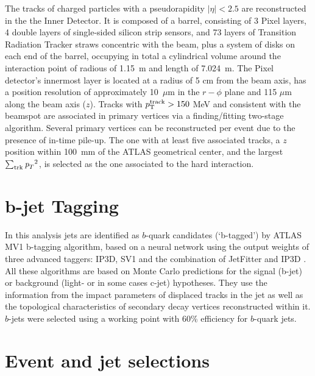 The tracks of charged particles with a pseudorapidity $|\eta| < 2.5$ are reconstructed in the the Inner Detector. It is composed of a barrel, consisting of 3 Pixel layers, 4 double layers of single-sided silicon strip sensors, and 73 layers of Transition Radiation Tracker straws concentric with the beam, plus a system of disks on each end of the barrel, occupying in total a cylindrical volume around the interaction point of radious of 1.15~m and length of 7.024~m. The Pixel detector's innermost layer is located at a radius of 5 cm from the beam axis, has a position resolution of approximately 10~$\mu$m in the $r-\phi$ plane and 115 $\mu$m along the beam axis ($z$). Tracks with $p^{\rm{track}}_{\rm{T}} > 150$ MeV and consistent with the beamspot are associated in primary vertices via a finding/fitting two-stage algorithm. Several primary vertices can be reconstructed per event due to the presence of in-time pile-up. The one with at least five associated tracks, a $z$ position within 100~mm of the ATLAS geometrical center, and the largest $\sum_{\rm trk}{\emph{p}_{T}}^2$, is selected as the one associated to the hard interaction.

\section{ $\bm b$-jet Tagging}\label{sec:btagging}

In this analysis jets are identified as $b$-quark candidates (‘b-tagged’) by ATLAS MV1 b-tagging algorithm, based on a neural network using the output weights of three advanced taggers: IP3D, SV1 and the combination of JetFitter and IP3D \cite{ATLAS-CONF-2011-102}. All these algorithms are based on Monte Carlo predictions for the signal (b-jet) or background (light- or in some cases c-jet) hypotheses. They use the information from the impact parameters of displaced tracks in the jet as well as the topological characteristics of secondary decay vertices reconstructed within it. $b$-jets were selected using a working point with 60\% efficiency for $b$-quark jets.


\section{Event and jet selections}\label{sec:EventSelection}

